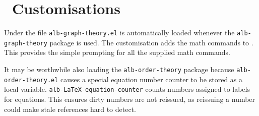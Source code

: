 \documentclass[11pt,a4paper,oneside,titlepage]{alb-latex}
\begin{document}
\section{\AUCTeX\ Customisations}
\label{sec:alb-graph-theory-documentation:auctex-cust}

Under \AUCTeX{} the file \texttt{alb-graph-theory.el} is automatically
loaded whenever the \texttt{alb-graph-theory} package is used.  The
customisation adds the math commands to \AUCTeX{}.  This provides the
simple prompting for all the supplied math commands.

It may be worthwhile also loading the \texttt{alb-order-theory} package
because \texttt{alb-order-theory.el} causes a special equation number
counter to be stored as a local variable.
\texttt{alb-LaTeX-equation-counter} counts numbers assigned to labels
for equations.  This ensures dirty numbers are not reissued, as
reissuing a number could make stale references hard to detect.
\end{document}
